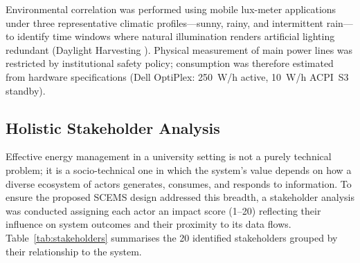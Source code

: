 \documentclass[conference]{IEEEtran}
\begin{document}
Environmental correlation was performed using mobile lux-meter applications under three representative climatic profiles—sunny, rainy, and intermittent rain—to identify time windows where natural illumination renders artificial lighting redundant (Daylight Harvesting \cite{williams2012}). Physical measurement of main power lines was restricted by institutional safety policy; consumption was therefore estimated from hardware specifications (Dell OptiPlex: 250~W/h active, 10~W/h ACPI~S3 standby).

\subsection{Holistic Stakeholder Analysis}

Effective energy management in a university setting is not a purely technical problem; it is a socio-technical one in which the system's value depends on how a diverse ecosystem of actors generates, consumes, and responds to information. To ensure the proposed SCEMS design addressed this breadth, a stakeholder analysis was conducted assigning each actor an impact score (1–20) reflecting their influence on system outcomes and their proximity to its data flows. Table~\ref{tab:stakeholders} summarises the 20 identified stakeholders grouped by their relationship to the system.
\end{document}
